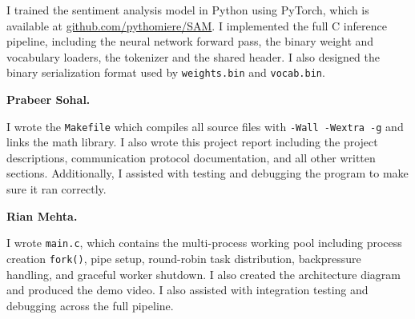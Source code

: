 \documentclass[12pt]{article}
\begin{document}
I trained the sentiment analysis model in Python using PyTorch, which is available at \url{github.com/pythomiere/SAM}. I implemented the full C inference pipeline, including the neural network forward pass, the binary weight and vocabulary loaders, the tokenizer and the shared header. I also designed the binary serialization format used by \texttt{weights.bin} and \texttt{vocab.bin}.

\medskip
\textbf{Prabeer Sohal.}

I wrote the \texttt{Makefile} which compiles all source files with \texttt{-Wall -Wextra -g} and links the math library. I also wrote this project report including the project descriptions, communication protocol documentation, and all other written sections. Additionally, I assisted with testing and debugging the program to make sure it ran correctly.

\medskip
\textbf{Rian Mehta.}

I wrote \texttt{main.c}, which contains the multi-process working pool including process creation \texttt{fork()}, pipe setup, round-robin task distribution, backpressure handling, and graceful worker shutdown. I also created the architecture diagram and produced the demo video. I also assisted with integration testing and debugging across the full pipeline.
\end{document}

